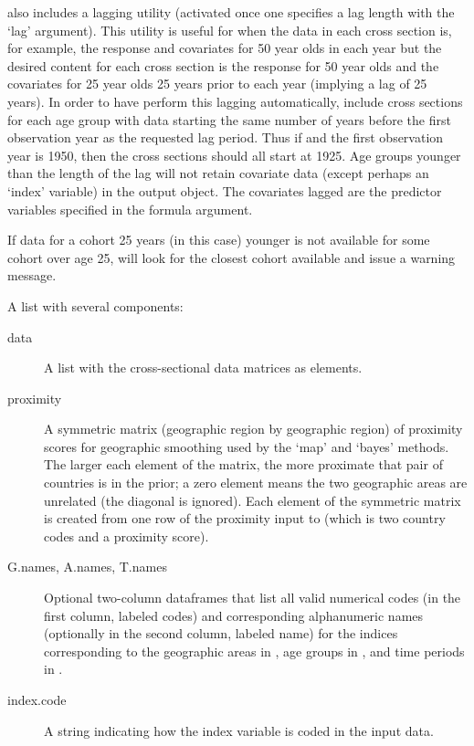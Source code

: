 \begin{Details}
 also includes a lagging utility (activated once
one specifies a lag length with the `lag' argument). This
utility is useful for when the data in each cross section is, for
example, the response and covariates for 50 year olds in each year
but the desired content for each cross section is the response for
50 year olds and the covariates for 25 year olds 25 years prior to
each year (implying a lag of 25 years). In order to have
 perform this lagging automatically, include cross
sections for each age group with data starting the same number of
years before the first observation year as the requested lag
period. Thus if  and the first observation year is
1950, then the cross sections should all start at 1925. Age groups
younger than the length of the lag will not retain covariate data
(except perhaps an `index' variable) in the output
object. The covariates lagged are the predictor variables specified
in the formula argument.

If data for a cohort 25 years (in this case) younger is not
available for some cohort over age 25,  will look
for the closest cohort available and issue a warning message. 

\end{Details}
%
\begin{Value}
\begin{ldescription}
\item[\code{dataobj}] A list with several components:

\begin{description}
 

\item[data] A list with the cross-sectional data matrices as elements.

\item[proximity] A symmetric matrix (geographic region by geographic
region) of proximity scores for geographic smoothing used by the `map'
and `bayes' methods. The larger each element of the matrix, the more
proximate that pair of countries is in the prior; a zero element means
the two geographic areas are unrelated (the diagonal is ignored).
Each element of the symmetric matrix is created from one row of the
proximity input to  (which is two country codes and a
proximity score).

\item[G.names, A.names, T.names] Optional two-column dataframes that
list all valid numerical codes (in the first column, labeled codes)
and corresponding alphanumeric names (optionally in the second
column, labeled name) for the indices corresponding to the geographic
areas in , age groups in , and time
periods in .

\item[index.code] A string indicating how the index variable is coded
in the input data.
\end{description}
\end{ldescription}
\end{Value}
